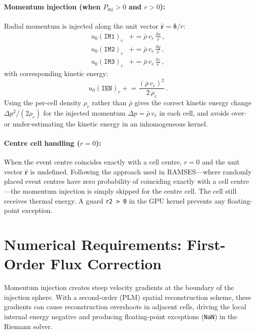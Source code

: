 \documentclass[11pt]{article}
\begin{document}
\paragraph{Momentum injection (when $P_\mathrm{inj} > 0$ and $r > 0$):}
Radial momentum is injected along the unit vector
$\hat{\boldsymbol{r}} = \boldsymbol{\delta}/r$:
\begin{align}
  u_0(\texttt{IM1})_c &\mathrel{+}= \bar{\rho}\,v_r\,\frac{\delta x}{r}\,, \\
  u_0(\texttt{IM2})_c &\mathrel{+}= \bar{\rho}\,v_r\,\frac{\delta y}{r}\,, \\
  u_0(\texttt{IM3})_c &\mathrel{+}= \bar{\rho}\,v_r\,\frac{\delta z}{r}\,,
\end{align}
with corresponding kinetic energy:
\begin{equation}
  u_0(\texttt{IEN})_c \mathrel{+}= \frac{(\bar{\rho}\,v_r)^2}{2\,\rho_c}\,.
\end{equation}
Using the per-cell density $\rho_c$ rather than $\bar{\rho}$ gives the correct
kinetic energy change $\Delta p^2 / (2\rho_c)$ for the injected momentum
$\Delta p = \bar{\rho}\,v_r$ in each cell, and avoids over- or under-estimating
the kinetic energy in an inhomogeneous kernel.

\paragraph{Centre cell handling ($r = 0$):}
When the event centre coincides exactly with a cell centre, $r = 0$ and the
unit vector $\hat{\boldsymbol{r}}$ is undefined.  Following the approach used
in RAMSES---where randomly placed event centres have zero probability of
coinciding exactly with a cell centre---the momentum injection is simply
skipped for the centre cell.  The cell still receives thermal energy.  A
guard \texttt{r2 > 0} in the GPU kernel prevents any floating-point
exception.

\section{Numerical Requirements: First-Order Flux Correction}

Momentum injection creates steep velocity gradients at the boundary of the
injection sphere.  With a second-order (PLM) spatial reconstruction scheme,
these gradients can cause reconstruction overshoots in adjacent cells, driving
the local internal energy negative and producing floating-point exceptions
(\texttt{NaN}) in the Riemann solver.
\end{document}
